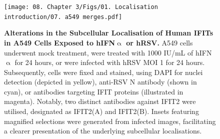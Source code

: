 \begin{figure}
    \centering
    \texttt{[image: 08. Chapter 3/Figs/01. Localisation introduction/07. a549 merges.pdf]}
    \caption[Alterations in the Subcellular Localisation of Human IFITs in A549 Cells Exposed to hIFN$\upalpha$ or hRSV.]{\textbf{Alterations in the Subcellular Localisation of Human IFITs in A549 Cells Exposed to hIFN$\upalpha$ or hRSV.} A549 cells underwent mock treatment, were treated with 1000 IU/mL of hIFN$\upalpha$ for 24 hours, or were infected with hRSV MOI 1 for 24 hours. Subsequently, cells were fixed and stained, using DAPI for nuclei detection (depicted in yellow), anti-RSV N antibody (shown in cyan), or antibodies targeting IFIT proteins (illustrated in magenta). Notably, two distinct antibodies against IFIT2 were utilised, designated as IFIT2(A) and IFIT2(B). Insets featuring magnified selections were generated from infected images, facilitating a clearer presentation of the underlying subcellular localisations.}
    \label{fig:Alterations in the Subcellular Localisation of Human IFITs in A549 Cells Exposed to hIFNa or hRSV}
\end{figure}

